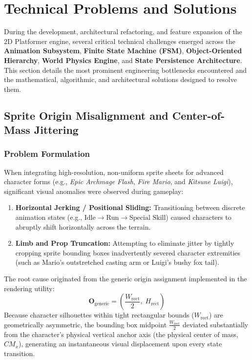 \section{Technical Problems and Solutions}
\label{sec:technical_problems_and_solutions}

During the development, architectural refactoring, and feature expansion of the 2D Platformer engine, several critical technical challenges emerged across the \textbf{Animation Subsystem}, \textbf{Finite State Machine (FSM)}, \textbf{Object-Oriented Hierarchy}, \textbf{World Physics Engine}, and \textbf{State Persistence Architecture}. This section details the most prominent engineering bottlenecks encountered and the mathematical, algorithmic, and architectural solutions designed to resolve them.

\subsection{Sprite Origin Misalignment and Center-of-Mass Jittering}
\label{subsec:sprite_misalignment}

\subsubsection{Problem Formulation}
When integrating high-resolution, non-uniform sprite sheets for advanced character forms (e.g., \textit{Epic Archmage Flash}, \textit{Fire Mario}, and \textit{Kitsune Luigi}), significant visual anomalies were observed during gameplay:
\begin{enumerate}
    \item \textbf{Horizontal Jerking / Positional Sliding:} Transitioning between discrete animation states (e.g., $\text{Idle} \rightarrow \text{Run} \rightarrow \text{Special Skill}$) caused characters to abruptly shift horizontally across the terrain.
    \item \textbf{Limb and Prop Truncation:} Attempting to eliminate jitter by tightly cropping sprite bounding boxes inadvertently severed character extremities (such as Mario's outstretched casting arm or Luigi's bushy fox tail).
\end{enumerate}

The root cause originated from the generic origin assignment implemented in the rendering utility:
\begin{equation}
    \mathbf{O}_{\text{generic}} = \left( \frac{W_{\text{rect}}}{2}, \; H_{\text{rect}} \right)
\end{equation}
Because character silhouettes within tight rectangular bounds ($W_{\text{rect}}$) are geometrically asymmetric, the bounding box midpoint $\frac{W_{\text{rect}}}{2}$ deviated substantially from the character's physical vertical anchor axis (the physical center of mass, $CM_x$), generating an instantaneous visual displacement upon every state transition.

